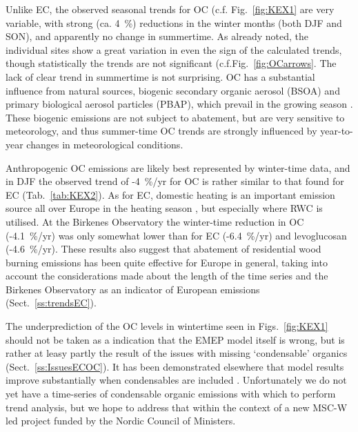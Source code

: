 Unlike EC, the observed seasonal trends for OC (c.f. Fig.~\ref{fig:KEX1} are very variable, with strong (ca. 4~\%) reductions in the winter months (both DJF and SON), and apparently no change in summertime. As already noted, the individual sites show a great variation in even the sign of the calculated trends, though statistically the trends are not significant (c.f.Fig.~\ref{fig:OCarrows}. The lack of clear trend in summertime is not surprising. 
OC has a substantial influence from
natural sources, biogenic secondary organic aerosol (BSOA) and primary
biological aerosol particles (PBAP), which prevail in the growing season \citep[e.g.][]{Gelencser:CARB,Yttri2019}.
These biogenic emissions are not subject to abatement, but are very sensitive to meteorology, and thus summer-time OC trends are strongly influenced by year-to-year changes in meteorological conditions.

Anthropogenic OC emissions
are likely best represented by winter-time data, and in DJF the observed trend of -4~\%/yr for OC is rather similar to that found for EC (Tab.~\ref{tab:KEX2}). As
for EC, domestic heating is an important emission source 
all over Europe in the heating season
\citep[e.g.][]{Yttri2019}, but especially where RWC is utilised.
At the Birkenes
Observatory the winter-time reduction in OC (-4.1~\%/yr) was only somewhat
lower than for EC (-6.4~\%/yr) and levoglucosan (-4.6~\%/yr).
These results also suggest
that abatement of residential wood burning emissions has been quite
effective for Europe in general, taking into account the considerations
made about the length of the time series and the Birkenes Observatory as
an indicator of European emissions (Sect.~\ref{ss:trendsEC}).  

The underprediction of the OC levels in wintertime seen in Figs.~\ref{fig:KEX1} should not be taken as a indication that the EMEP model itself is wrong, but is rather at leasy partly the result of the issues with missing `condensable' organics (Sect.~\ref{ss:IssuesECOC}). It has been demonstrated elsewhere that model results improve substantially when condensables are included \citep{DeniervanderGon2015,R2019:SVOC,R2020:SVOC}. Unfortunately we do not yet have a time-series of condensable organic emissions with which to perform trend analysis, but we hope to address that within the context of a new MSC-W led project funded by the Nordic Council of Ministers.

